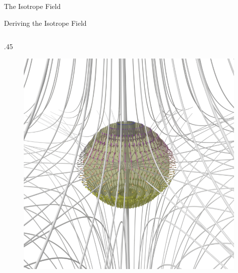 \documentclass[final]{beamer}
\newlength{\onecolwid}
\begin{document}
\begin{frame}[t]
\begin{columns}[t]
\begin{column}{\onecolwid}
\begin{block}{\huge{The Isotrope Field}}
\begin{block}{Deriving the Isotrope Field}
\begin{columns}[t,totalwidth=\onecolwid]
\begin{column}{.45\onecolwid}
\begin{centering}
\begin{figure}
        \includegraphics[width=.45\onecolwid]{fig/negindex_start.png}
        \end{figure}
        \end{centering}
    \end{column}


\end{columns}
\end{block}
\end{block}
\end{column}
\end{columns}
\end{frame}
\end{document}

